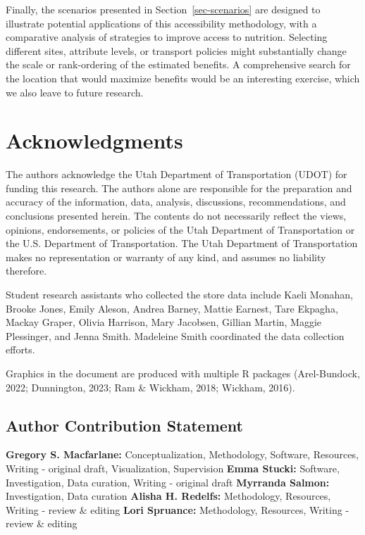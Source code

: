 \documentclass[
  letterpaper,
  number,
  review,
  3p]{elsarticle}
\begin{document}
Finally, the scenarios presented in Section~\ref{sec-scenarios} are
designed to illustrate potential applications of this accessibility
methodology, with a comparative analysis of strategies to improve access
to nutrition. Selecting different sites, attribute levels, or transport
policies might substantially change the scale or rank-ordering of the
estimated benefits. A comprehensive search for the location that would
maximize benefits would be an interesting exercise, which we also leave
to future research.


\section*{Acknowledgments}\label{acknowledgments}


The authors acknowledge the Utah Department of Transportation (UDOT) for
funding this research. The authors alone are responsible for the
preparation and accuracy of the information, data, analysis,
discussions, recommendations, and conclusions presented herein. The
contents do not necessarily reflect the views, opinions, endorsements,
or policies of the Utah Department of Transportation or the U.S.
Department of Transportation. The Utah Department of Transportation
makes no representation or warranty of any kind, and assumes no
liability therefore.

Student research assistants who collected the store data include Kaeli
Monahan, Brooke Jones, Emily Aleson, Andrea Barney, Mattie Earnest, Tare
Ekpagha, Mackay Graper, Olivia Harrison, Mary Jacobsen, Gillian Martin,
Maggie Plessinger, and Jenna Smith. Madeleine Smith coordinated the data
collection efforts.

Graphics in the document are produced with multiple R packages
(Arel-Bundock, 2022; Dunnington, 2023; Ram \& Wickham, 2018; Wickham,
2016).

\subsection*{Author Contribution
Statement}\label{author-contribution-statement}


\textbf{Gregory S. Macfarlane:} Conceptualization, Methodology,
Software, Resources, Writing - original draft, Visualization,
Supervision \textbf{Emma Stucki:} Software, Investigation, Data
curation, Writing - original draft \textbf{Myrranda Salmon:}
Investigation, Data curation \textbf{Alisha H. Redelfs:} Methodology,
Resources, Writing - review \& editing \textbf{Lori Spruance:}
Methodology, Resources, Writing - review \& editing
\end{document}
